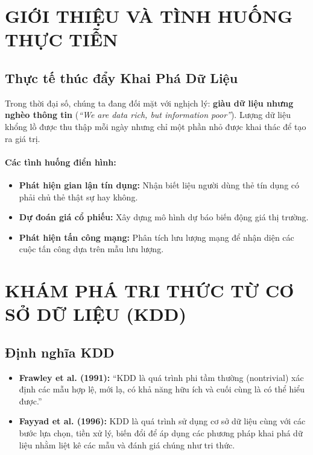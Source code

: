\documentclass[10pt]{article}
\begin{document}
\onehalfspacing
\renewcommand{\arraystretch}{1.5}

\newcommand{\ChapterNum}{1}
\newcommand{\ChapterTitle}{TỔNG QUAN VỀ KHAI PHÁ DỮ LIỆU (DATA MINING)}


\section{GIỚI THIỆU VÀ TÌNH HUỐNG THỰC TIỄN}

\subsection{Thực tế thúc đẩy Khai Phá Dữ Liệu}

Trong thời đại số, chúng ta đang đối mặt với nghịch lý: \textbf{giàu dữ liệu nhưng nghèo thông tin} (\textit{``We are data rich, but information poor''}). Lượng dữ liệu khổng lồ được thu thập mỗi ngày nhưng chỉ một phần nhỏ được khai thác để tạo ra giá trị.

\paragraph{Các tình huống điển hình:}
\begin{itemize}
    \item \textbf{Phát hiện gian lận tín dụng:} Nhận biết liệu người dùng thẻ tín dụng có phải chủ thẻ thật sự hay không.
    \item \textbf{Dự đoán giá cổ phiếu:} Xây dựng mô hình dự báo biến động giá thị trường.
    \item \textbf{Phát hiện tấn công mạng:} Phân tích lưu lượng mạng để nhận diện các cuộc tấn công dựa trên mẫu lưu lượng.
\end{itemize}

\section{KHÁM PHÁ TRI THỨC TỪ CƠ SỞ DỮ LIỆU (KDD)}

\subsection{Định nghĩa KDD}

\begin{itemize}
    \item \textbf{Frawley et al. (1991):} ``KDD là quá trình phi tầm thường (nontrivial) xác định các mẫu hợp lệ, mới lạ, có khả năng hữu ích và cuối cùng là có thể hiểu được.''
    \item \textbf{Fayyad et al. (1996):} KDD là quá trình sử dụng cơ sở dữ liệu cùng với các bước lựa chọn, tiền xử lý, biến đổi để áp dụng các phương pháp khai phá dữ liệu nhằm liệt kê các mẫu và đánh giá chúng như tri thức.
\end{itemize}
\end{document}
